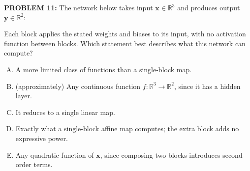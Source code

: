 \documentclass[12pt]{amsart}
\begin{document}
{\bf PROBLEM 11:}
%
The network below takes input $\mathbf{x} \in \mathbb{R}^3$ and produces output $\mathbf{y} \in \mathbb{R}^2$:
\begin{center}
\end{center}
%
Each block applies the stated weights and biases to its input, with no activation function between blocks. 
Which statement best describes what this network can compute?

\begin{enumerate}[(A)]
\item A more limited class of functions than a single-block map.
\item (approximately) Any continuous function $f: \mathbb{R}^3 \to \mathbb{R}^2$, since it has a hidden layer.
\item It reduces to a single linear map.
\item Exactly what a single-block affine map computes; the extra block adds no expressive power.
\item Any quadratic function of $\mathbf{x}$, since composing two blocks introduces second-order terms.
\end{enumerate}

%
\end{document}
